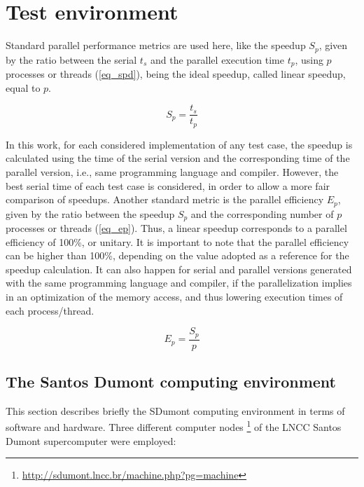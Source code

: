 %
%
%
\section{Test environment}
\label{sec_analintr}

Standard parallel performance metrics are used here, like the speedup $S_p$, given by the ratio between the serial $t_s$ and the parallel execution time $t_p$, using $p$ processes or threads (\autoref {eq_spd}), being the ideal speedup, called linear speedup, equal to $p$.

\vspace{-2mm}
\begin{equation}\label{eq_spd}
S_p = \frac{t_s}{t_p}
\end{equation}

In this work, for each considered implementation of any test case, the speedup is calculated using the time of the serial version and the corresponding time of the parallel version, i.e., same programming language and compiler. However, the best serial time of each test case is considered, in order to allow a more fair comparison of speedups. Another standard metric is the parallel efficiency $E_p$, given by the ratio between the speedup $S_p$ and the corresponding number of $p$ processes or threads (\autoref {eq_ep}). Thus, a linear speedup corresponds to a parallel efficiency of 100\%, or unitary. It is important to note that the parallel efficiency can be higher than 100\%, depending on the value adopted as a reference for the speedup calculation. It can also happen for serial and parallel versions generated with the same programming language and compiler, if the parallelization implies in an optimization of the memory access, and thus lowering execution times of each process/thread.

\vspace{-2mm}
\begin{equation}\label{eq_ep}
E_p = \frac{S_p}{p}
\end{equation}

%
%
%
\subsection{The Santos Dumont computing environment}
\label{sec_sdenviron}

This section describes briefly the SDumont computing environment in terms of software and hardware. Three different computer nodes \footnote{\url{http://sdumont.lncc.br/machine.php?pg=machine}} of the LNCC Santos Dumont supercomputer were employed:

